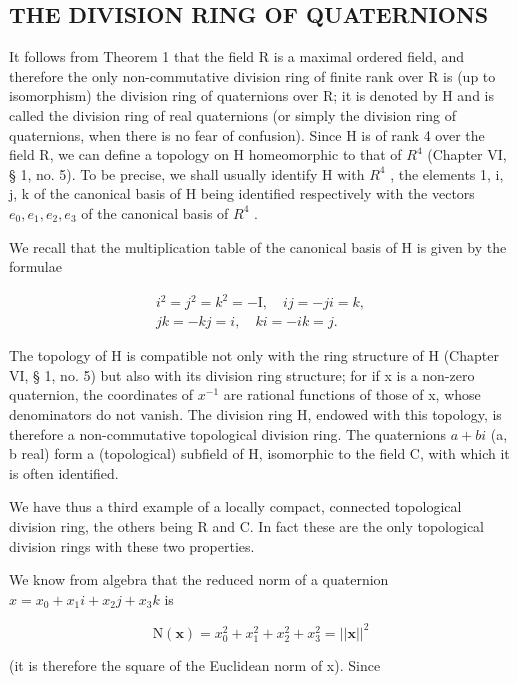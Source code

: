 \subsection{THE DIVISION RING OF QUATERNIONS}

It follows from Theorem 1 that the field R is a maximal ordered field, and therefore the only non-commutative division ring of finite rank over R is (up to isomorphism) the division ring of quaternions over R; it is denoted by H and is called the division ring of real quaternions (or simply the division ring of quaternions, when there is no fear of confusion). Since H is of rank 4 over the field R, we can define a topology on H homeomorphic to that of \(R^{4}\) (Chapter VI, § 1, no. 5). To be precise, we shall usually identify H with \(R^{4}\) , the elements 1, i, j, k of the canonical basis of H being identified respectively with the vectors \(e_{0}, e_{1}, e_{2}, e_{3}\) of the canonical basis of \(R^{4}\) .

We recall that the multiplication table of the canonical basis of H is given by the formulae

\[
\begin{array}{c} i ^ {2} = j ^ {2} = k ^ {2} = - \mathrm{I}, \quad i j = - j i = k, \\ j k = - k j = i, \quad k i = - i k = j. \end{array}
\]

The topology of H is compatible not only with the ring structure of H (Chapter VI, § 1, no. 5) but also with its division ring structure; for if x is a non-zero quaternion, the coordinates of \(x^{-1}\) are rational functions of those of x, whose denominators do not vanish. The division ring H, endowed with this topology, is therefore a non-commutative topological division ring. The quaternions \(a + bi\) (a, b real) form a (topological) subfield of H, isomorphic to the field C, with which it is often identified.

We have thus a third example of a locally compact, connected topological division ring, the others being R and C. In fact these are the only topological division rings with these two properties.

We know from algebra that the reduced norm of a quaternion \(x = x_{0} + x_{1}i + x_{2}j + x_{3}k\) is

\[
\mathrm{N} (\boldsymbol {x}) = x _ {0} ^ {2} + x _ {1} ^ {2} + x _ {2} ^ {2} + x _ {3} ^ {2} = | | \boldsymbol {x} | | ^ {2}
\]

(it is therefore the square of the Euclidean norm of x). Since

